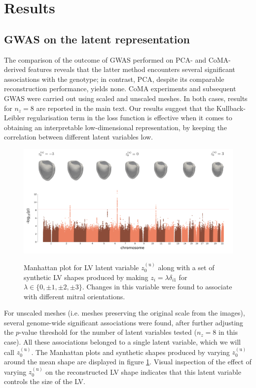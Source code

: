 \section*{Results}
\subsection*{GWAS on the latent representation}
\label{subsec_GWAS}


The comparison of the outcome of GWAS performed on PCA- and CoMA-derived features reveals that the latter method encounters several significant associations with the genotype; in contrast, PCA, despite its comparable reconstruction performance, yields none. %
CoMA experiments and subsequent GWAS were carried out using scaled and unscaled meshes. In both cases, results for $n_z=8$ are reported in the main text. Our results suggest that the Kullback-Leibler regularisation term in the loss function is effective when it comes to obtaining an interpretable low-dimensional representation, by keeping the correlation between different latent variables low. 

\begin{figure}[ht!]
\includegraphics[width=\textwidth]{figs/gwas/GWAS_Experiment2_z0u_unscaled_meshes.png}
\label{fig:manhattan_LV_latent_unscaled}
\caption{Manhattan plot for LV latent variable $z_0^{(\text{u})}$ along with a set of synthetic LV shapes produced by making $z_i=\lambda \delta_{i1}$ for $\lambda\in\{0, \pm 1, \pm 2, \pm 3\}$. Changes in this variable were found to associate with different mitral orientations.}
\end{figure}


For unscaled meshes (i.e. meshes preserving the original scale from the images), several genome-wide significant associations were found, after further adjusting the $p$-value threshold for the number of latent variables tested ($n_z=8$ in this case). All these associations belonged to a single latent variable, which we will call $z_0^{(\text{u})}$. The Manhattan plots and synthetic shapes produced by varying $z_0^{(\text{u})}$ around the mean shape are displayed in figure \ref{fig:manhattan_LV_latent_unscaled}. Visual inspection of the effect of varying $z_0^{(\text{u})}$ on the reconstructed LV shape indicates that this latent variable controls the size of the LV. 

